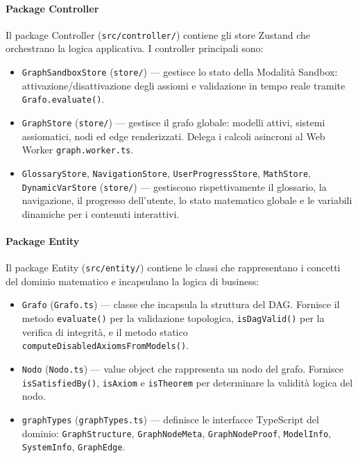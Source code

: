 \documentclass[12pt,a4paper]{article}
\begin{document}
\paragraph{Package Controller}
Il package Controller (\texttt{src/controller/}) contiene gli store Zustand che orchestrano la logica applicativa. I controller principali sono:
\begin{itemize}
    \item \texttt{GraphSandboxStore} (\texttt{store/}) — gestisce lo stato della Modalità Sandbox: attivazione/disattivazione degli assiomi e validazione in tempo reale tramite \texttt{Grafo.evaluate()}.
    \item \texttt{GraphStore} (\texttt{store/}) — gestisce il grafo globale: modelli attivi, sistemi assiomatici, nodi ed edge renderizzati. Delega i calcoli asincroni al Web Worker \texttt{graph.worker.ts}.
    \item \texttt{GlossaryStore}, \texttt{NavigationStore}, \texttt{UserProgressStore}, \texttt{MathStore}, \texttt{DynamicVarStore} (\texttt{store/}) — gestiscono rispettivamente il glossario, la navigazione, il progresso dell'utente, lo stato matematico globale e le variabili dinamiche per i contenuti interattivi.
\end{itemize}

\paragraph{Package Entity}
Il package Entity (\texttt{src/entity/}) contiene le classi che rappresentano i concetti del dominio matematico e incapsulano la logica di business:
\begin{itemize}
    \item \texttt{Grafo} (\texttt{Grafo.ts}) — classe che incapsula la struttura del DAG. Fornisce il metodo \texttt{evaluate()} per la validazione topologica, \texttt{isDagValid()} per la verifica di integrità, e il metodo statico \texttt{computeDisabledAxiomsFromModels()}.
    \item \texttt{Nodo} (\texttt{Nodo.ts}) — value object che rappresenta un nodo del grafo. Fornisce \texttt{isSatisfiedBy()}, \texttt{isAxiom} e \texttt{isTheorem} per determinare la validità logica del nodo.
    \item \texttt{graphTypes} (\texttt{graphTypes.ts}) — definisce le interfacce TypeScript del dominio: \texttt{GraphStructure}, \texttt{GraphNodeMeta}, \texttt{GraphNodeProof}, \texttt{ModelInfo}, \texttt{SystemInfo}, \texttt{GraphEdge}.
\end{itemize}
\end{document}
